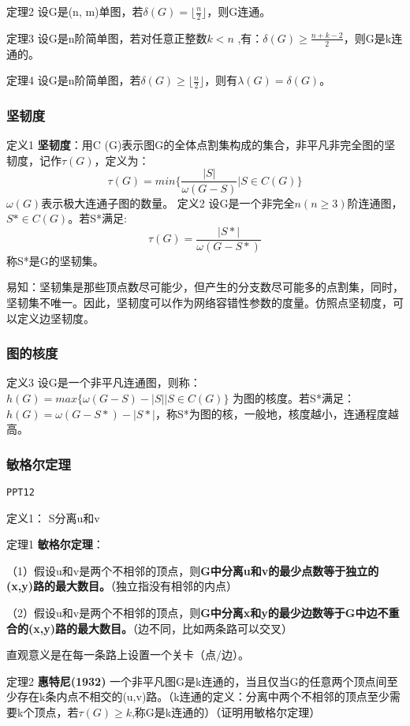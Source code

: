 \documentclass{article}
\begin{document}
定理2 设G是(n, m)单图，若$\delta(G)  = \lfloor \frac{n}{2} \rfloor$，则G连通。

定理3 设G是n阶简单图，若对任意正整数$k < n$ ,有：$\delta(G) \ge \frac{n+k-2}{2}$，则G是k连通的。

定理4 设G是n阶简单图，若$\delta (G) \ge \lfloor \frac{n}{2} \rfloor$，则有$\lambda (G) = \delta(G)$。

\subsubsection{坚韧度}
定义1 \textbf{坚韧度}：用C (G)表示图G的全体点割集构成的集合，非平凡非完全图的坚韧度，记作$\tau(G)$，定义为：
$$\tau(G) = min\{ \frac{|S|}{\omega(G-S)}|S\in C(G)\}$$
$\omega(G)$表示极大连通子图的数量。
定义2 设G是一个非完全$n (n\ge 3)$阶连通图，$S* \in C (G)$。若S*满足:
$$\tau(G) = \frac{|S*|}{\omega(G-S*)}$$
称S*是G的坚韧集。

易知：坚韧集是那些顶点数尽可能少，但产生的分支数尽可能多的点割集，同时，坚韧集不唯一。因此，坚韧度可以作为网络容错性参数的度量。仿照点坚韧度，可以定义边坚韧度。

\subsubsection{图的核度}

定义3 设G是一个非平凡连通图，则称：
$h(G) = max\{\omega(G-S) - |S||S \in C(G)\}$
为图的核度。若S*满足：
$ℎ(G) = \omega(G − S *) − |S*|$，称S*为图的核，一般地，核度越小，连通程度越高。

\subsubsection{敏格尔定理}

\texttt{PPT12}

定义1： S分离u和v

定理1 \textbf{敏格尔定理}：

\quad（1）假设u和v是两个不相邻的顶点，则\textbf{G中分离u和v的最少点数等于独立的(x,y)路的最大数目。}（独立指没有相邻的内点）

\quad（2）假设u和v是两个不相邻的顶点，则\textbf{G中分离x和y的最少边数等于G中边不重合的(x,y)路的最大数目。}（边不同，比如两条路可以交叉）

直观意义是在每一条路上设置一个关卡（点/边）。

定理2 \textbf{惠特尼(1932)}  一个非平凡图G是k连通的，当且仅当G的任意两个顶点间至少存在k条内点不相交的(u,v)路。（k连通的定义：分离中两个不相邻的顶点至少需要k个顶点，若$\tau(G) \ge k$,称G是k连通的）（证明用敏格尔定理）
\end{document}
